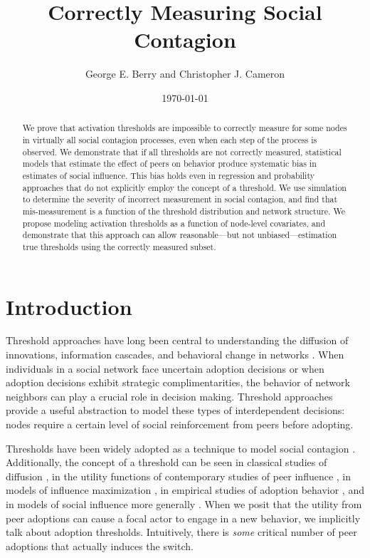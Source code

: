 \documentclass[a4paper]{article}
\title{Correctly Measuring Social Contagion}
\author{George E. Berry and Christopher J. Cameron}
\date{\today}
\begin{document}
\maketitle

\begin{abstract}
We prove that activation thresholds are impossible to correctly measure for some nodes in virtually all social contagion processes, even when each step of the process is observed. We demonstrate that if all thresholds are not correctly measured, statistical models that estimate the effect of peers on behavior produce systematic bias in estimates of social influence. This bias holds even in regression and probability approaches that do not explicitly employ the concept of a threshold. We use simulation to determine the severity of incorrect measurement in social contagion, and find that mis-measurement is a function of the threshold distribution and network structure. We propose modeling activation thresholds as a function of node-level covariates, and demonstrate that this approach can allow reasonable---but not unbiased---estimation true thresholds using the correctly measured subset.
\end{abstract}

\section{Introduction}

Threshold approaches have long been central to understanding the diffusion of innovations, information cascades, and behavioral change in networks \parencite{Rogers1962, Granovetter1978, Valente1996, Kempe2003, Macy1990, Watts2002}. When individuals in a social network face uncertain adoption decisions or when adoption decisions exhibit strategic complimentarities, the behavior of network neighbors can play a crucial role in decision making. Threshold approaches provide a useful abstraction to model these types of interdependent decisions: nodes require a certain level of social reinforcement from peers before adopting.

Thresholds have been widely adopted as a technique to model social contagion \parencite{Centola2007, Granovetter1978, Watts2002, Greve1995a, Macy1991c}. Additionally, the concept of a threshold can be seen in classical studies of diffusion \parencite{Coleman1957, Rogers1962, Burt2016, Granovetter1986}, in the utility functions of contemporary studies of peer influence \parencite{}, in models of influence maximization \parencite{}, in empirical studies of adoption behavior \parencite{Valente1995, Valente1996, Ludemann1999a, Romero2011}, and in models of social influence more generally \parencite{christakis-fowler, Marsden, Friedkin}. When we posit that the utility from peer adoptions can cause a focal actor to engage in a new behavior, we implicitly talk about adoption thresholds. Intuitively, there is \emph{some} critical number of peer adoptions that actually induces the switch.
\end{document}
